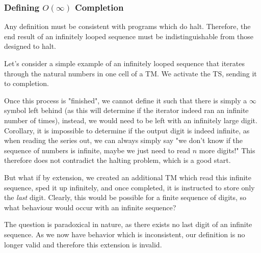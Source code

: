 \documentclass{report}
\begin{document}
\subsubsection{Defining $O(\infty)$ Completion}

Any definition must be consistent with programs which do halt. Therefore, the end result of an infinitely looped sequence must be indistinguishable from those designed to halt.

Let's consider a simple example of an infinitely looped sequence that iterates through the natural numbers in one cell of a TM. We activate the TS, sending it to completion.

Once this process is "finished", we cannot define it such that there is simply a $\infty$ symbol left behind (as this will determine if the iterator indeed ran an infinite number of times), instead, we would need to be left with an infinitely large digit. Corollary, it is impossible to determine if the output digit is indeed infinite, as when reading the series out, we can always simply say "we don't know if the sequence of numbers is infinite, maybe we just need to read $n$ more digits!" This therefore does not contradict the halting problem, which is a good start.

But what if by extension, we created an additional TM which read this infinite sequence, sped it up infinitely, and once completed, it is instructed to store only the \textit{last} digit. Clearly, this would be possible for a finite sequence of digits, so what behaviour would occur with an infinite sequence?

The question is paradoxical in nature, as there exists no last digit of an infinite sequence. As we now have behavior which is inconsistent, our definition is no longer valid and therefore this extension is invalid.



\end{document}
